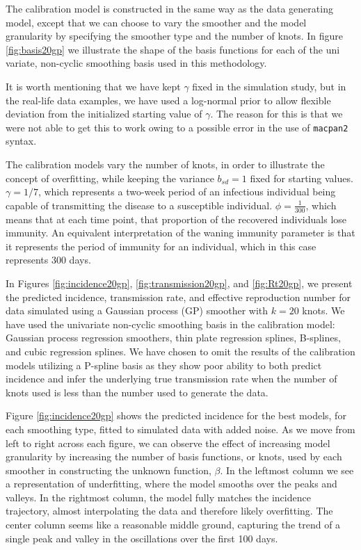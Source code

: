 \documentclass[
11pt, %
oneside, %
english, %
singlespacing, %
]{macthesis} %
\begin{document}
The calibration model is constructed in the same way as the data generating model, except that we can choose to vary the smoother and the model granularity by specifying the smoother type and the number of knots. In figure \ref{fig:basis20gp} we illustrate the shape of the basis functions for each of the uni variate, non-cyclic smoothing basis used in this methodology.

It is worth mentioning that we have kept \(\gamma\) fixed in the simulation study, but in the real-life data examples, we have used a log-normal prior to allow flexible deviation from the initialized starting value of \(\gamma\). The reason for this is that we were not able to get this to work owing to a possible error in the use of \texttt{macpan2} syntax.

The calibration models vary the number of knots, in order to illustrate the concept of overfitting, while keeping the variance \(b_{sd} = 1\) fixed for starting values. \(\gamma = 1/7\), which represents a two-week period of an infectious individual being capable of transmitting the disease to a susceptible individual. \(\phi = \frac{1}{300}\), which means that at each time point, that proportion of the recovered individuals lose immunity. An equivalent interpretation of the waning immunity parameter is that it represents the period of immunity for an individual, which in this case represents 300 days.

In Figures \ref{fig:incidence20gp}, \ref{fig:transmission20gp}, and \ref{fig:Rt20gp}, we present the predicted incidence, transmission rate, and effective reproduction number for data simulated using a Gaussian process (GP) smoother with \(k=20\) knots. We have used the univariate non-cyclic smoothing basis in the calibration model: Gaussian process regression smoothers, thin plate regression splines, B-splines, and cubic regression splines. We have chosen to omit the results of the calibration models utilizing a P-spline basis as they show poor ability to both predict incidence and infer the underlying true transmission rate when the number of knots used is less than the number used to generate the data.

Figure \ref{fig:incidence20gp} shows the predicted incidence for the best models, for each smoothing type, fitted to simulated data with added noise. As we move from left to right across each figure, we can observe the effect of increasing model granularity by increasing the number of basis functions, or knots, used by each smoother in constructing the unknown function, \(\beta\). In the leftmost column we see a representation of underfitting, where the model smooths over the peaks and valleys. In the rightmost column, the model fully matches the incidence trajectory, almost interpolating the data and therefore likely overfitting. The center column seems like a reasonable middle ground, capturing the trend of a single peak and valley in the oscillations over the first 100 days.
\end{document}
